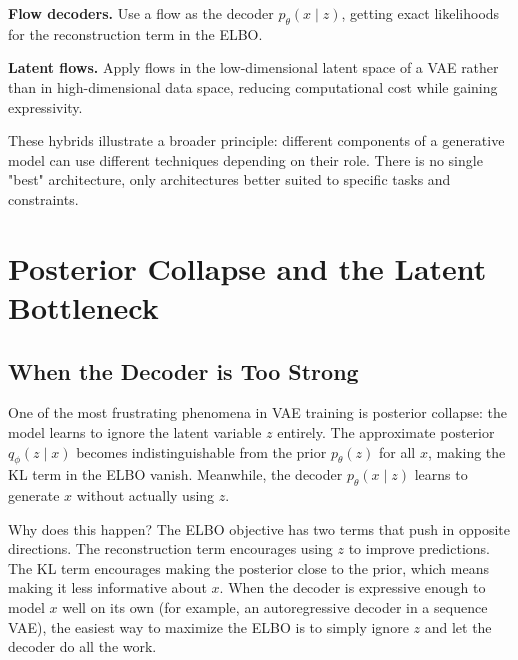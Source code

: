 \vspace{0.3cm}

\textbf{Flow decoders.} Use a flow as the decoder $p_\theta(x \mid z)$, getting exact likelihoods for the reconstruction term in the ELBO.

\vspace{0.3cm}

\textbf{Latent flows.} Apply flows in the low-dimensional latent space of a VAE rather than in high-dimensional data space, reducing computational cost while gaining expressivity.

\vspace{0.3cm}

These hybrids illustrate a broader principle: different components of a generative model can use different techniques depending on their role. There is no single "best" architecture, only architectures better suited to specific tasks and constraints.

\vspace{2em}

\section{Posterior Collapse and the Latent Bottleneck}
\label{sec:posterior_collapse}

\vspace{1em}

\subsection{When the Decoder is Too Strong}

One of the most frustrating phenomena in VAE training is posterior collapse: the model learns to ignore the latent variable $z$ entirely. The approximate posterior $q_\phi(z \mid x)$ becomes indistinguishable from the prior $p_\theta(z)$ for all $x$, making the KL term in the ELBO vanish. Meanwhile, the decoder $p_\theta(x \mid z)$ learns to generate $x$ without actually using $z$.

\vspace{0.3cm}

Why does this happen? The ELBO objective has two terms that push in opposite directions. The reconstruction term encourages using $z$ to improve predictions. The KL term encourages making the posterior close to the prior, which means making it less informative about $x$. When the decoder is expressive enough to model $x$ well on its own (for example, an autoregressive decoder in a sequence VAE), the easiest way to maximize the ELBO is to simply ignore $z$ and let the decoder do all the work.

